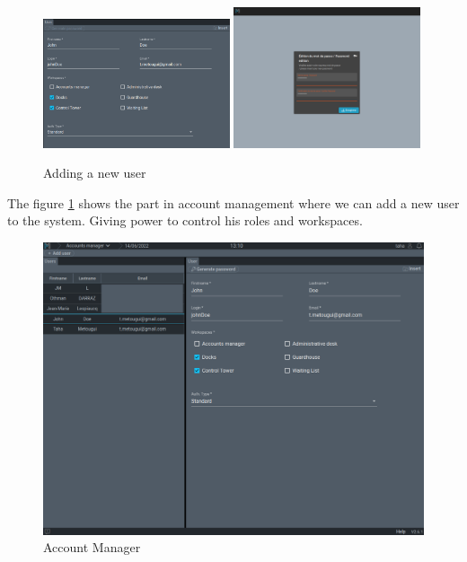 \begin{figure}[!ht]
    \centering
    \includegraphics[width=0.49\textwidth]{images/insertingANewUser}
    \hfill
    \includegraphics[width=0.49\textwidth]{images/password}
    \caption{\footnotesize{Adding a new user}}
    \label{fig:insert_user}
\end{figure}

The figure \ref{fig:insert_user} shows the part in account management where we can add
a new user to the system. Giving power to control his roles and workspaces.

\begin{figure}[!ht]
    \centering
    \includegraphics[width=\textwidth]{images/accManager}
    \caption{\footnotesize{Account Manager}}
    \label{fig:accManager}
\end{figure}

